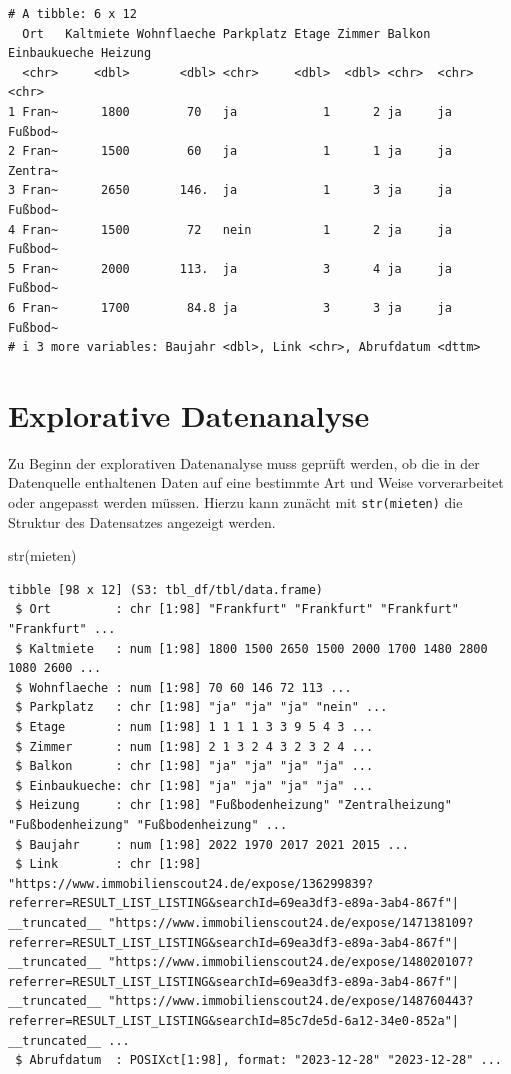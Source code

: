 \documentclass[
  a4paper,
  DIV=11]{scrartcl}
\newenvironment{Shaded}{\begin{snugshade}}{\end{snugshade}}
\newcommand{\FunctionTok}[1]{\textcolor[rgb]{0.28,0.35,0.67}{#1}}
\newcommand{\NormalTok}[1]{\textcolor[rgb]{0.00,0.23,0.31}{#1}}
\begin{document}
\begin{verbatim}
# A tibble: 6 x 12
  Ort   Kaltmiete Wohnflaeche Parkplatz Etage Zimmer Balkon Einbaukueche Heizung
  <chr>     <dbl>       <dbl> <chr>     <dbl>  <dbl> <chr>  <chr>        <chr>  
1 Fran~      1800        70   ja            1      2 ja     ja           Fußbod~
2 Fran~      1500        60   ja            1      1 ja     ja           Zentra~
3 Fran~      2650       146.  ja            1      3 ja     ja           Fußbod~
4 Fran~      1500        72   nein          1      2 ja     ja           Fußbod~
5 Fran~      2000       113.  ja            3      4 ja     ja           Fußbod~
6 Fran~      1700        84.8 ja            3      3 ja     ja           Fußbod~
# i 3 more variables: Baujahr <dbl>, Link <chr>, Abrufdatum <dttm>
\end{verbatim}

\hypertarget{explorative-datenanalyse}{%
\section{Explorative Datenanalyse}\label{explorative-datenanalyse}}

Zu Beginn der explorativen Datenanalyse muss geprüft werden, ob die in
der Datenquelle enthaltenen Daten auf eine bestimmte Art und Weise
vorverarbeitet oder angepasst werden müssen. Hierzu kann zunächt mit
\texttt{str(mieten)} die Struktur des Datensatzes angezeigt werden.

\begin{Shaded}
\begin{Highlighting}[]
\FunctionTok{str}\NormalTok{(mieten)}
\end{Highlighting}
\end{Shaded}

\begin{verbatim}
tibble [98 x 12] (S3: tbl_df/tbl/data.frame)
 $ Ort         : chr [1:98] "Frankfurt" "Frankfurt" "Frankfurt" "Frankfurt" ...
 $ Kaltmiete   : num [1:98] 1800 1500 2650 1500 2000 1700 1480 2800 1080 2600 ...
 $ Wohnflaeche : num [1:98] 70 60 146 72 113 ...
 $ Parkplatz   : chr [1:98] "ja" "ja" "ja" "nein" ...
 $ Etage       : num [1:98] 1 1 1 1 3 3 9 5 4 3 ...
 $ Zimmer      : num [1:98] 2 1 3 2 4 3 2 3 2 4 ...
 $ Balkon      : chr [1:98] "ja" "ja" "ja" "ja" ...
 $ Einbaukueche: chr [1:98] "ja" "ja" "ja" "ja" ...
 $ Heizung     : chr [1:98] "Fußbodenheizung" "Zentralheizung" "Fußbodenheizung" "Fußbodenheizung" ...
 $ Baujahr     : num [1:98] 2022 1970 2017 2021 2015 ...
 $ Link        : chr [1:98] "https://www.immobilienscout24.de/expose/136299839?referrer=RESULT_LIST_LISTING&searchId=69ea3df3-e89a-3ab4-867f"| __truncated__ "https://www.immobilienscout24.de/expose/147138109?referrer=RESULT_LIST_LISTING&searchId=69ea3df3-e89a-3ab4-867f"| __truncated__ "https://www.immobilienscout24.de/expose/148020107?referrer=RESULT_LIST_LISTING&searchId=69ea3df3-e89a-3ab4-867f"| __truncated__ "https://www.immobilienscout24.de/expose/148760443?referrer=RESULT_LIST_LISTING&searchId=85c7de5d-6a12-34e0-852a"| __truncated__ ...
 $ Abrufdatum  : POSIXct[1:98], format: "2023-12-28" "2023-12-28" ...
\end{verbatim}
\end{document}

